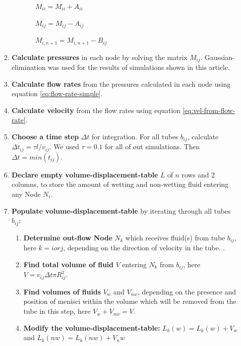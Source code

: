 \documentclass[
	12pt
] {article}
\begin{document}
\begin{enumerate}
\begin{enumerate}
\begin{enumerate}
\begin{enumerate}
					$M_{ii} = M_{ii} + A_{ii}$
				
					$M_{ij} = M_{ij} - A_{ij}$
				
					$M_{i,n + 1} = M_{i,n + 1} - B_{ij}$
			\end{enumerate}
		\end{enumerate}
		
		\item \textbf{Calculate pressures} in each node by solving the matrix $M_{ij}$. Gaussian-elimination was used for the results of simulations shown in this article. 
		
		\item \textbf{Calculate flow rates} from the pressures calculated in each node using equation \ref{eq:flow-rate-simple}.
		
		\item \textbf{Calculate velocity} from the flow rates using equation \ref{eq:vel-from-flow-rate}.
		
		\item \textbf{Choose a time step} $\Delta t$ for integration. For all tubes $b_{ij}$, calculate $\Delta t_{ij} = \tau l/v_{ij}$. We used $\tau = 0.1$ for all of out simulations. Then $\Delta t = min(t_{ij})$. 
		
		\item \textbf{Declare empty volume-displacement-table} $L$ of $n$ rows and 2 columns, to store the amount of wetting and non-wetting fluid entering any Node $N_i$.
		
		\item \textbf{Populate volume-displacement-table} by iterating through all tubes $b_{ij}$:
		\begin{enumerate}
			\item \textbf{Determine out-flow Node} $N_k$ which receives fluid(s) from tube $b_{ij}$, here $k = i or j$, depending on the direction of velocity in the tube. .
			
			\item \textbf{Find total volume of fluid} $V$ entering $N_k$ from $b_{ij}$, here $V = v_{ij} \Delta t \pi R_{ij}^2$.
			
			\item \textbf{Find volumes of fluids} $V_{w}$ and $V_{nw}$, depending on the presence and position of menisci within the volume which will be removed from the tube in this step, here $V_{w} + V_{nw} = V$.
			
			\item \textbf{Modify the volume-displacement-table:} $L_k(w) = L_k(w) + V_w$ and $L_k(nw) = L_k(nw) + V_nw$
		\end{enumerate}
		

\end{enumerate}
\end{enumerate}
\end{document}
